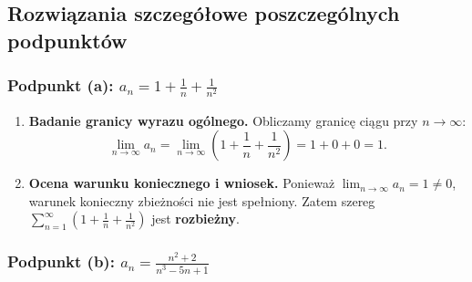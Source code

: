 \vspace{0.2cm}

\subsection*{Rozwiązania szczegółowe poszczególnych podpunktów}

\subsubsection*{Podpunkt (a): $\displaystyle a_n = 1 + \frac{1}{n} + \frac{1}{n^2}$}

\begin{enumerate}[label=\textbf{Krok \arabic*.},leftmargin=*]
    \item \textbf{Badanie granicy wyrazu ogólnego.}
    Obliczamy granicę ciągu przy $n \to \infty$:
    \begin{equation*}
        \lim_{n \to \infty} a_n = \lim_{n \to \infty} \left(1 + \frac{1}{n} + \frac{1}{n^2}\right) = 1 + 0 + 0 = 1.
    \end{equation*}
    \item \textbf{Ocena warunku koniecznego i wniosek.}
    Ponieważ $\lim_{n \to \infty} a_n = 1 \neq 0$, warunek konieczny zbieżności nie jest spełniony. Zatem szereg $\displaystyle\sum_{n=1}^{\infty} \left(1 + \frac{1}{n} + \frac{1}{n^2}\right)$ jest \textbf{rozbieżny}.
\end{enumerate}

\subsubsection*{Podpunkt (b): $\displaystyle a_n = \frac{n^2+2}{n^3-5n+1}$}

